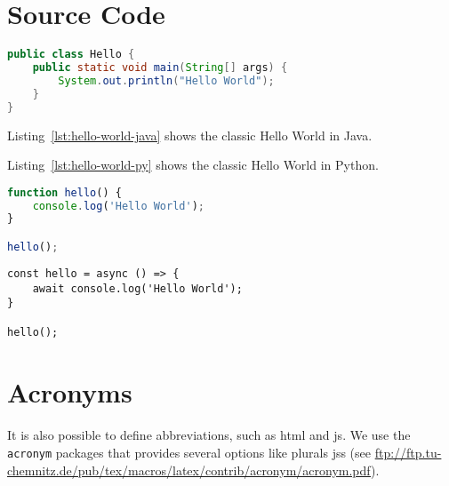 \section{Source Code}

\begin{lstlisting}[language=Java, caption=Hello World in Java, label=lst:hello-world-java]
public class Hello {
    public static void main(String[] args) {
        System.out.println("Hello World");
    }
}
\end{lstlisting}

Listing~\ref{lst:hello-world-java} shows the classic Hello World in Java.



Listing~\ref{lst:hello-world-py} shows the classic Hello World in Python.

\begin{lstlisting}[language=JavaScript, caption=Hello World in JavaScript, label=lst:hello-world-javascript]
function hello() {
    console.log('Hello World');
}

hello();
\end{lstlisting}

\newpage
\begin{lstlisting}[language=ES6, caption=Hello World in JavaScript (ES6), label=lst:hello-world-javascript]
const hello = async () => {
    await console.log('Hello World');
}

hello();
\end{lstlisting}

\section{Acronyms}
It is also possible to define abbreviations, such as \ac{html} and \ac{js}. We use the \texttt{acronym} packages that provides several options like plurals \acp{js} (see \url{ftp://ftp.tu-chemnitz.de/pub/tex/macros/latex/contrib/acronym/acronym.pdf}).
